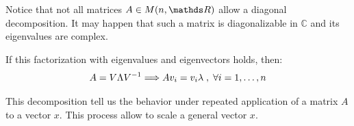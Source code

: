 \documentclass[ComputationalMathematics.tex]{subfiles}
\begin{document}

Notice that not all matrices $A \in M(n, \R)$ allow a diagonal decomposition.
It may happen that such a matrix is diagonalizable in $\mathds{C}$ and its eigenvalues are complex.

\begin{proposition} If this factorization with eigenvalues and eigenvectors holds, then:
  $$ A = V \Lambda {V}^{-1} \Longrightarrow Av_i = v_i\lambda \; , \; \forall i = 1, \dots, n $$
\end{proposition}

\noindent This decomposition tell us the behavior under repeated application of a matrix $A$ to a vector $x$. This process allow to scale a general vector $x$.\\

\end{document}

